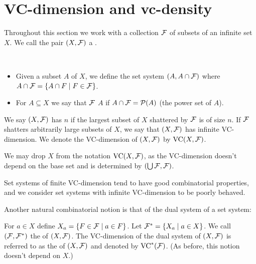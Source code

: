

\section{VC-dimension and vc-density}




Throughout this section we work with a collection $\mathcal F$ of subsets of an infinite set $X$.
We call the pair $(X, \mathcal F)$ a .

\begin{Definition} \ 
  \begin{itemize} 
  \item Given a subset $A$ of $X$, we define the set system $(A, A \cap \mathcal F)$
    where $A \cap \mathcal F = \left\{A \cap F \mid F\in \mathcal F\right\}$.
  \item For $A \subseteq X$ we say that $\mathcal F$  $A$ if $A \cap \mathcal F = \mathcal P(A)$ (the power set of $A$).
  \end{itemize}    
\end{Definition}  

\begin{Definition}
  We say $(X, \mathcal F)$ has  $n$ if the largest subset of $X$ shattered by $\mathcal F$ is of size $n$.
  If $\mathcal F$ shatters arbitrarily large subsets of $X$, we say that $(X, \mathcal F)$ has infinite VC-dimension.
  We denote the VC-dimension of $(X, \mathcal F)$ by $\operatorname{VC}(X, \mathcal F)$.
\end{Definition}  

\begin{Note}
  We may drop $X$ from the notation $\operatorname{VC}(X, \mathcal F)$, as the VC-dimension doesn't depend on the base set and is determined by $(\bigcup \mathcal F, \mathcal F)$.
\end{Note}
Set systems of finite VC-dimension tend to have good combinatorial properties,
and we consider set systems with infinite VC-dimension to be poorly behaved.

Another natural combinatorial notion is that of the dual system of a set system:
\begin{Definition}
  For $a \in X$ define $X_a = \left\{F \in \mathcal F \mid a \in F\right\}$.
  Let $\mathcal F^* = \left\{X_a \mid a \in X\right\}$.
  We call $(\mathcal F, \mathcal F^*)$ the  of $(X, \mathcal F)$.
  The VC-dimension of the dual system of $(X, \mathcal F)$ is referred to as the  of $(X, \mathcal F)$ and denoted by $\operatorname{VC}^*(\mathcal F)$.
  (As before, this notion doesn't depend on $X$.)
\end{Definition}  

